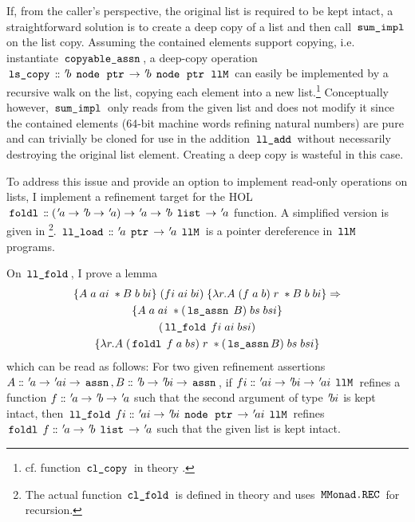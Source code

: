 If, from the caller's perspective, the original list is required to be kept intact, a straightforward solution is to create a deep copy of a list and then call $\,\text{\ttfamily sum\_impl}\,$ on the list copy.
Assuming the contained elements support copying, i.e. instantiate $\,\text{\ttfamily copyable\_assn}\,$, a deep-copy operation $\,\text{\ttfamily ls\_copy}\, \mathrel{\mathord{:}\mkern-1.2mu\mathord{:}} {\mskip2mu '\mskip-2mub} \; \,\text{\ttfamily node}\, \; \,\text{\ttfamily ptr}\, \rightarrow {\mskip2mu '\mskip-2mub} \; \,\text{\ttfamily node}\, \; \,\text{\ttfamily ptr}\, \; \,\text{\ttfamily llM}\,$ can easily be implemented by a recursive walk on the list, copying each element into a new list.\footnote{cf. function $\,\text{\ttfamily cl\_copy}\,$ in theory .}
Conceptually however, $\,\text{\ttfamily sum\_impl}\,$ only reads from the given list and does not modify it since the contained elements (64-bit machine words refining natural numbers) are pure and can trivially be cloned for use in the addition $\,\text{\ttfamily ll\_add}\,$ without necessarily destroying the original list element.
Creating a deep copy is wasteful in this case.

To address this issue and provide an option to implement read-only operations on lists, I implement a refinement target for the HOL $\,\text{\ttfamily foldl}\, \mathrel{\mathord{:}\mkern-1.2mu\mathord{:}} ({\mskip2mu '\mskip-2mua} \rightarrow {\mskip2mu '\mskip-2mub} \rightarrow {\mskip2mu '\mskip-2mua}) \rightarrow {\mskip2mu '\mskip-2mua} \rightarrow {\mskip2mu '\mskip-2mub} \; \,\text{\ttfamily list}\, \rightarrow {\mskip2mu '\mskip-2mua}$ function.
A simplified version is given in \footnote{The actual function $\,\text{\ttfamily cl\_fold}\,$ is defined in theory  and uses $\,\text{\ttfamily MMonad.REC}\,$ for recursion.}.
$\,\text{\ttfamily ll\_load}\, \mathrel{\mathord{:}\mkern-1.2mu\mathord{:}} {\mskip2mu '\mskip-2mua} \; \,\text{\ttfamily ptr}\, \rightarrow {\mskip2mu '\mskip-2mua} \; \,\text{\ttfamily llM}\,$ is a pointer dereference in $\,\text{\ttfamily llM}\,$ programs.

On $\,\text{\ttfamily ll\_fold}\,$, I prove a lemma
\begin{gather*}
	\{A \; a \; ai \; \ast B \; b \; bi\} \;
	(fi \; ai \; bi) \;
	\{\lambda r. A \; (f \; a \; b) \; r \; \ast B \; b \; bi\} \Rightarrow \\
	\{A \; a \; ai \; \ast (\,\text{\ttfamily ls\_assn}\, \; B) \; bs \; bsi\} \\
	(\,\text{\ttfamily ll\_fold}\, \; fi \; ai \; bsi)\\
	\{\lambda r. A \; (\,\text{\ttfamily foldl}\, \; f \; a \; bs) \; r \; \ast (\,\text{\ttfamily ls\_assn}\, B) \; bs \; bsi\}
\end{gather*}
which can be read as follows: For two given refinement assertions $A \mathrel{\mathord{:}\mkern-1.2mu\mathord{:}} {\mskip2mu '\mskip-2mua} \rightarrow {\mskip2mu '\mskip-2muai} \rightarrow \,\text{\ttfamily assn}\,, B \mathrel{\mathord{:}\mkern-1.2mu\mathord{:}} {\mskip2mu '\mskip-2mub} \rightarrow {\mskip2mu '\mskip-2mubi} \rightarrow \,\text{\ttfamily assn}\,$, if $fi \mathrel{\mathord{:}\mkern-1.2mu\mathord{:}} {\mskip2mu '\mskip-2muai} \rightarrow {\mskip2mu '\mskip-2mubi} \rightarrow {\mskip2mu '\mskip-2muai} \; \,\text{\ttfamily llM}\,$ refines a function $f \mathrel{\mathord{:}\mkern-1.2mu\mathord{:}} {\mskip2mu '\mskip-2mua} \rightarrow {\mskip2mu '\mskip-2mub} \rightarrow {\mskip2mu '\mskip-2mua}$ such that the second argument of type ${\mskip2mu '\mskip-2mubi}$ is kept intact, then $\,\text{\ttfamily ll\_fold}\, \; fi \mathrel{\mathord{:}\mkern-1.2mu\mathord{:}} {\mskip2mu '\mskip-2muai} \rightarrow {\mskip2mu '\mskip-2mubi} \; \,\text{\ttfamily node}\, \; \,\text{\ttfamily ptr}\, \rightarrow {\mskip2mu '\mskip-2muai} \; \,\text{\ttfamily llM}\,$ refines $\,\text{\ttfamily foldl}\, \; f \mathrel{\mathord{:}\mkern-1.2mu\mathord{:}} {\mskip2mu '\mskip-2mua} \rightarrow {\mskip2mu '\mskip-2mub} \; \,\text{\ttfamily list}\, \rightarrow {\mskip2mu '\mskip-2mua}$ such that the given list is kept intact.

